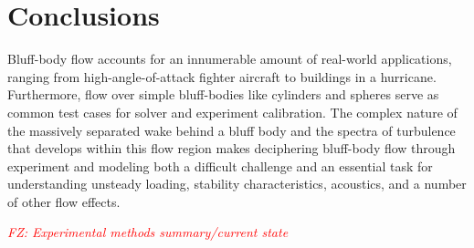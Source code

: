 \documentclass[journal]{new-aiaa}
\begin{document}


















\section{Conclusions}

Bluff-body flow accounts for an innumerable amount of real-world applications, ranging from high-angle-of-attack fighter aircraft to buildings in a hurricane. Furthermore, flow over simple bluff-bodies like cylinders and spheres serve as common test cases for solver and experiment calibration. The complex nature of the massively separated wake behind a bluff body and the spectra of turbulence that develops within this flow region makes deciphering bluff-body flow through experiment and modeling both a difficult challenge and an essential task for understanding unsteady loading, stability characteristics, acoustics, and a number of other flow effects.

\textcolor{red}{\emph{FZ: Experimental methods summary/current state}}
\end{document}
